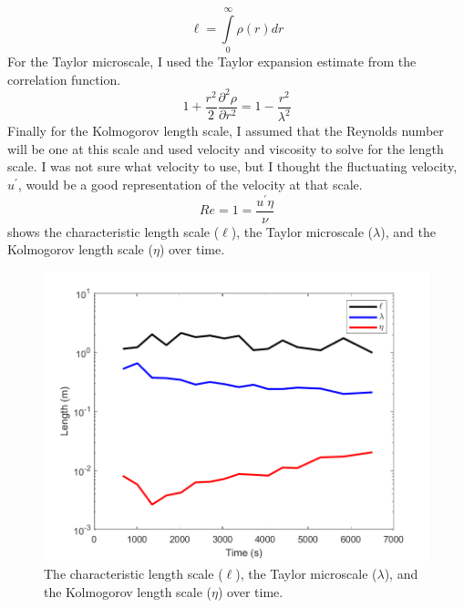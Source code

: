 \documentclass[11pt]{article}
\begin{document}
\begin{enumerate}
	\begin{equation}
		\ell = \int\limits_0^{\infty} \rho (r) dr
	\end{equation}
	For the Taylor microscale, I used the Taylor expansion estimate from the correlation function.
	\begin{equation}
		1+\frac{r^2}{2}\frac{\partial^2\rho}{\partial r^2} = 1-\frac{r^2}{\lambda^2}
	\end{equation}
	Finally for the Kolmogorov length scale, I assumed that the Reynolds number will be one at this scale and used velocity and viscosity to solve for the length scale. I was not sure what velocity to use, but I thought the fluctuating velocity, $u^{\prime}$, would be a good representation of the velocity at that scale.
	\begin{equation}
		Re = 1 = \frac{u^{\prime} \eta}{\nu}
	\end{equation}
	 shows the characteristic length scale ($\ell$), the Taylor microscale ($\lambda$), and the Kolmogorov length scale ($\eta$) over time.
	\begin{figure}[htbp]
		\centering
		\includegraphics[width=\textwidth]{1-plots/char_length_comp_plot.png}
		\caption{The characteristic length scale ($\ell$), the Taylor microscale ($\lambda$), and the Kolmogorov length scale ($\eta$) over time.}
		\label{fig:length}
	\end{figure}

\end{enumerate}
\end{document}
